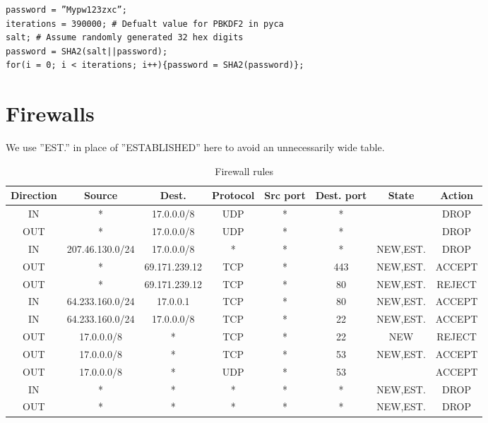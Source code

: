 \documentclass{article}
\begin{document}
\begin{verbatim}
password = ”Mypw123zxc”;
iterations = 390000; # Defualt value for PBKDF2 in pyca
salt; # Assume randomly generated 32 hex digits
password = SHA2(salt||password);
for(i = 0; i < iterations; i++){password = SHA2(password)};
\end{verbatim}

% 
% 





\newpage
\section{Firewalls}
We use ''EST.'' in place of ''ESTABLISHED'' here to avoid an unnecessarily wide table.

\begin{table}[h!]
\begin{adjustwidth}{-1.5in}{-1.5in}
    \centering
    \begin{tabular}{c|c|c|c|c|c|c|c}
         Direction & Source & Dest. & Protocol & Src port & Dest. port & State & Action \\
         \hline
         \hline
         IN & * & 17.0.0.0/8 & UDP & * & * &  & DROP \\
         OUT & * & 17.0.0.0/8 & UDP & * & * &  & DROP \\
         IN & 207.46.130.0/24 & 17.0.0.0/8 & * & * & * & NEW,EST. & DROP \\
         OUT & * & 69.171.239.12 & TCP & * & 443 & NEW,EST. & ACCEPT \\ %
         OUT & * & 69.171.239.12 & TCP & * & 80 & NEW,EST. & REJECT \\ %
         IN & 64.233.160.0/24 & 17.0.0.1 & TCP & * & 80 & NEW,EST. & ACCEPT \\
         IN & 64.233.160.0/24 & 17.0.0.0/8 & TCP & * & 22 & NEW,EST. & ACCEPT \\
         OUT & 17.0.0.0/8 & * & TCP & * & 22 & NEW & REJECT \\
         OUT & 17.0.0.0/8 & * & TCP & * & 53 & NEW,EST. & ACCEPT \\
         OUT & 17.0.0.0/8 & * & UDP & * & 53 &  & ACCEPT \\
         IN & * & * & * & * & * & NEW,EST. & DROP \\
         OUT & * & * & * & * & * & NEW,EST. & DROP
    \end{tabular}
    \caption{Firewall rules}
    \label{tab:firewall_rules}
    \end{adjustwidth}
\end{table}
\end{document}
